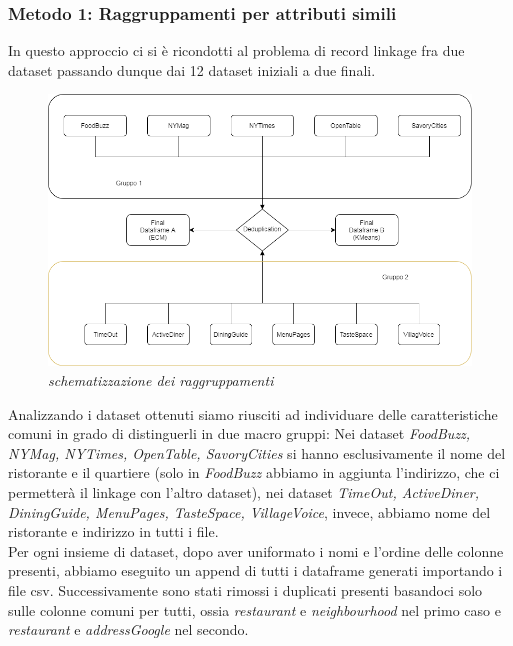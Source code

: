 \documentclass[a4paper,12pt]{article}
\begin{document}
\subsubsection{Metodo 1: Raggruppamenti per attributi simili}
In questo approccio ci si è ricondotti al problema di record linkage fra due dataset passando dunque dai 12 dataset iniziali a due finali. \\

\begin{figure}[H]
	\centering
	\includegraphics[width=0.9\linewidth]{img/diagramMethod.png}
	\caption{\textit{schematizzazione dei raggruppamenti}}
\end{figure}


\noindent Analizzando i dataset ottenuti siamo riusciti ad individuare delle caratteristiche comuni in grado di distinguerli in due macro gruppi:
Nei dataset \textit{FoodBuzz, NYMag, NYTimes, OpenTable, SavoryCities} si hanno esclusivamente il nome del ristorante e il quartiere (solo in \textit{FoodBuzz} abbiamo in aggiunta l'indirizzo, che ci permetterà il linkage con l'altro dataset), nei dataset \textit{TimeOut, ActiveDiner, DiningGuide, MenuPages, TasteSpace, VillageVoice}, invece, abbiamo nome del ristorante e indirizzo in tutti i file. \\

\noindent Per ogni insieme di dataset, dopo aver uniformato i nomi e l'ordine delle colonne presenti, abbiamo eseguito un append di tutti i dataframe generati importando i file csv. 
Successivamente sono stati rimossi i duplicati presenti basandoci solo sulle colonne comuni per tutti, ossia \textit{restaurant} e \textit{neighbourhood} nel primo caso e \textit{restaurant} e \textit{addressGoogle} nel secondo. \\
\end{document}
